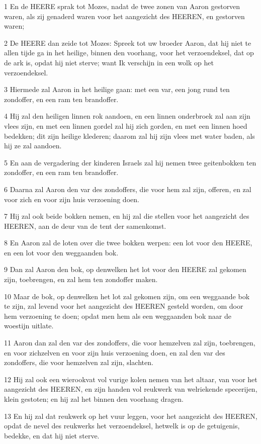 \par 1 En de HEERE sprak tot Mozes, nadat de twee zonen van Aaron gestorven waren, als zij genaderd waren voor het aangezicht des HEEREN, en gestorven waren;
\par 2 De HEERE dan zeide tot Mozes: Spreek tot uw broeder Aaron, dat hij niet te allen tijde ga in het heilige, binnen den voorhang, voor het verzoendeksel, dat op de ark is, opdat hij niet sterve; want Ik verschijn in een wolk op het verzoendeksel.
\par 3 Hiermede zal Aaron in het heilige gaan: met een var, een jong rund ten zondoffer, en een ram ten brandoffer.
\par 4 Hij zal den heiligen linnen rok aandoen, en een linnen onderbroek zal aan zijn vlees zijn, en met een linnen gordel zal hij zich gorden, en met een linnen hoed bedekken; dit zijn heilige klederen; daarom zal hij zijn vlees met water baden, als hij ze zal aandoen.
\par 5 En aan de vergadering der kinderen Israels zal hij nemen twee geitenbokken ten zondoffer, en een ram ten brandoffer.
\par 6 Daarna zal Aaron den var des zondoffers, die voor hem zal zijn, offeren, en zal voor zich en voor zijn huis verzoening doen.
\par 7 Hij zal ook beide bokken nemen, en hij zal die stellen voor het aangezicht des HEEREN, aan de deur van de tent der samenkomst.
\par 8 En Aaron zal de loten over die twee bokken werpen: een lot voor den HEERE, en een lot voor den weggaanden bok.
\par 9 Dan zal Aaron den bok, op denwelken het lot voor den HEERE zal gekomen zijn, toebrengen, en zal hem ten zondoffer maken.
\par 10 Maar de bok, op denwelken het lot zal gekomen zijn, om een weggaande bok te zijn, zal levend voor het aangezicht des HEEREN gesteld worden, om door hem verzoening te doen; opdat men hem als een weggaanden bok naar de woestijn uitlate.
\par 11 Aaron dan zal den var des zondoffers, die voor hemzelven zal zijn, toebrengen, en voor zichzelven en voor zijn huis verzoening doen, en zal den var des zondoffers, die voor hemzelven zal zijn, slachten.
\par 12 Hij zal ook een wierookvat vol vurige kolen nemen van het altaar, van voor het aangezicht des HEEREN, en zijn handen vol reukwerk van welriekende specerijen, klein gestoten; en hij zal het binnen den voorhang dragen.
\par 13 En hij zal dat reukwerk op het vuur leggen, voor het aangezicht des HEEREN, opdat de nevel des reukwerks het verzoendeksel, hetwelk is op de getuigenis, bedekke, en dat hij niet sterve.
